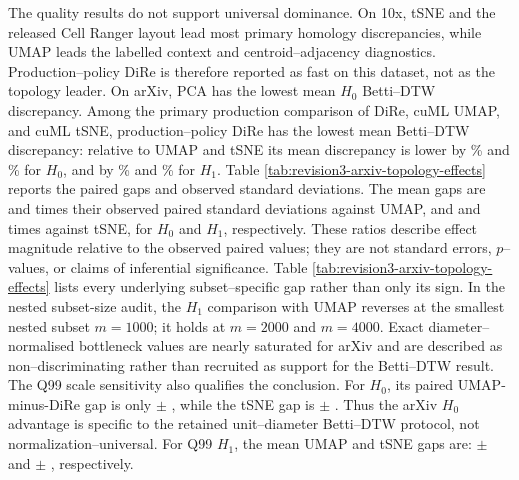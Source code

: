 \documentclass[11pt]{article}
\begin{document}
The quality results do not support universal dominance. On 10x, tSNE and the
released Cell Ranger layout lead most primary homology discrepancies, while
UMAP leads the labelled context and centroid--adjacency diagnostics.
Production--policy DiRe is therefore reported as fast on this dataset, not as
the topology leader. On arXiv, PCA has the lowest mean $H_0$ Betti--DTW
discrepancy. Among the primary production comparison of DiRe, cuML UMAP, and
cuML tSNE, production--policy DiRe has the lowest mean Betti--DTW discrepancy:
relative to UMAP and tSNE its mean discrepancy is lower by
\ArxivDireBetaZeroDtwReductionVsUmapPct\% and
\ArxivDireBetaZeroDtwReductionVsTsnePct\% for $H_0$, and by
\ArxivDireBetaOneDtwReductionVsUmapPct\% and
\ArxivDireBetaOneDtwReductionVsTsnePct\% for $H_1$. Table
\ref{tab:revision3-arxiv-topology-effects} reports the paired gaps and observed
standard deviations. The mean gaps are
\ArxivUmapMinusDireBetaZeroDtwGapInObservedSd{} and
\ArxivUmapMinusDireBetaOneDtwGapInObservedSd{} times their observed paired
standard deviations against UMAP, and
\ArxivTsneMinusDireBetaZeroDtwGapInObservedSd{} and
\ArxivTsneMinusDireBetaOneDtwGapInObservedSd{} times against tSNE, for $H_0$
and $H_1$, respectively. These ratios describe effect magnitude relative to
the \TopologySubsetCount{} observed paired values; they are not standard errors, $p$--values,
or claims of inferential significance. Table
\ref{tab:revision3-arxiv-topology-effects} lists every underlying
subset--specific gap rather than only its sign. In the nested subset-size
audit, the $H_1$ comparison with UMAP
reverses at the smallest nested subset $m=1000$; it holds at $m=2000$ and
$m=4000$. Exact diameter--normalised bottleneck values are nearly saturated
for arXiv and are described as non--discriminating rather than recruited as
support for the Betti--DTW result. The Q99 scale sensitivity also qualifies
the conclusion. For $H_0$, its paired UMAP-minus-DiRe gap is only
\ArxivUmapMinusDireBetaZeroQNinetyNineDtwGap{}$\pm$
\ArxivUmapMinusDireBetaZeroQNinetyNineDtwGapSd{}, while the
tSNE gap is
\ArxivTsneMinusDireBetaZeroQNinetyNineDtwGap{}$\pm$
\ArxivTsneMinusDireBetaZeroQNinetyNineDtwGapSd{}. Thus the arXiv
$H_0$ advantage is specific to the retained unit--diameter Betti--DTW
protocol, not normalization--universal. For Q99 $H_1$, the mean UMAP and tSNE
gaps are:
\ArxivUmapMinusDireBetaOneQNinetyNineDtwGap{}$\pm$
\ArxivUmapMinusDireBetaOneQNinetyNineDtwGapSd{} and
\ArxivTsneMinusDireBetaOneQNinetyNineDtwGap{}$\pm$
\ArxivTsneMinusDireBetaOneQNinetyNineDtwGapSd{}, respectively.
\end{document}
